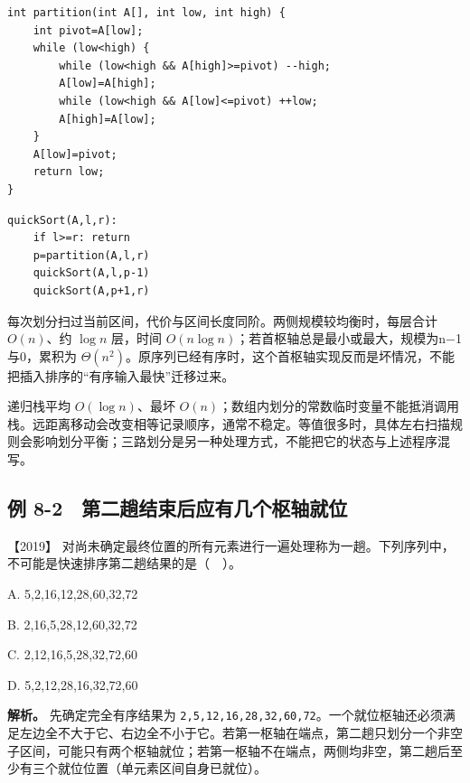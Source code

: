 \par\medskip\noindent
\begin{minipage}{\linewidth}
\begin{verbatim}
int partition(int A[], int low, int high) {
    int pivot=A[low];
    while (low<high) {
        while (low<high && A[high]>=pivot) --high;
        A[low]=A[high];
        while (low<high && A[low]<=pivot) ++low;
        A[high]=A[low];
    }
    A[low]=pivot;
    return low;
}
\end{verbatim}
\end{minipage}\par\medskip

\par\medskip\noindent
\begin{minipage}{\linewidth}
\begin{verbatim}
quickSort(A,l,r):
    if l>=r: return
    p=partition(A,l,r)
    quickSort(A,l,p-1)
    quickSort(A,p+1,r)
\end{verbatim}
\end{minipage}\par\medskip

每次划分扫过当前区间，代价与区间长度同阶。两侧规模较均衡时，每层合计 \(O(n)\)、约 \(\log n\) 层，时间 \(O(n\log n)\)；若首枢轴总是最小或最大，规模为n−1与0，累积为 \(\Theta(n^2)\)。原序列已经有序时，这个首枢轴实现反而是坏情况，不能把插入排序的``有序输入最快''迁移过来。

递归栈平均 \(O(\log n)\)、最坏 \(O(n)\)；数组内划分的常数临时变量不能抵消调用栈。远距离移动会改变相等记录顺序，通常不稳定。等值很多时，具体左右扫描规则会影响划分平衡；三路划分是另一种处理方式，不能把它的状态与上述程序混写。

\subsection{例 8-2　第二趟结束后应有几个枢轴就位}\label{ds-ex8-2}

\noindent{}【2019】 对尚未确定最终位置的所有元素进行一遍处理称为一趟。下列序列中，不可能是快速排序第二趟结果的是（　）。

A. 5,2,16,12,28,60,32,72

B. 2,16,5,28,12,60,32,72

C. 2,12,16,5,28,32,72,60

D. 5,2,12,28,16,32,72,60


\textbf{解析。} 先确定完全有序结果为 \texttt{2,}\allowbreak{}\texttt{5,}\allowbreak{}\texttt{12,}\allowbreak{}\texttt{16,}\allowbreak{}\texttt{28,}\allowbreak{}\texttt{32,}\allowbreak{}\texttt{60,}\allowbreak{}\texttt{72}。一个就位枢轴还必须满足左边全不大于它、右边全不小于它。若第一枢轴在端点，第二趟只划分一个非空子区间，可能只有两个枢轴就位；若第一枢轴不在端点，两侧均非空，第二趟后至少有三个就位位置（单元素区间自身已就位）。

